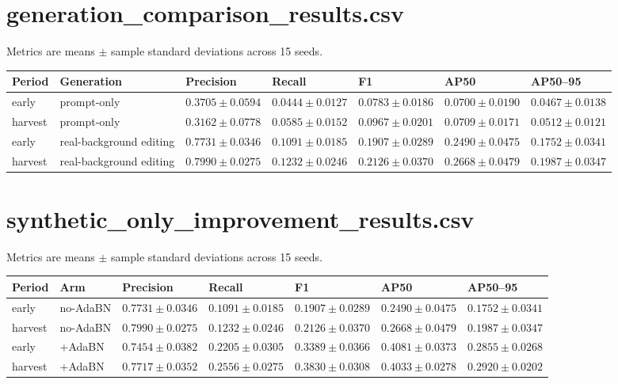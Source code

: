 \documentclass{article}
\begin{document}
\section*{generation\_comparison\_results.csv}
Metrics are means $\pm$ sample standard deviations across 15 seeds.\par\medskip
\begin{lrbox}{\resulttable}\begin{tabular}{lllllll}
\toprule
Period & Generation & Precision & Recall & F1 & AP50 & AP50--95 \\
\midrule
early & prompt-only & $0.3705 \pm 0.0594$ & $0.0444 \pm 0.0127$ & $0.0783 \pm 0.0186$ & $0.0700 \pm 0.0190$ & $0.0467 \pm 0.0138$ \\
harvest & prompt-only & $0.3162 \pm 0.0778$ & $0.0585 \pm 0.0152$ & $0.0967 \pm 0.0201$ & $0.0709 \pm 0.0171$ & $0.0512 \pm 0.0121$ \\
early & real-background editing & $0.7731 \pm 0.0346$ & $0.1091 \pm 0.0185$ & $0.1907 \pm 0.0289$ & $0.2490 \pm 0.0475$ & $0.1752 \pm 0.0341$ \\
harvest & real-background editing & $0.7990 \pm 0.0275$ & $0.1232 \pm 0.0246$ & $0.2126 \pm 0.0370$ & $0.2668 \pm 0.0479$ & $0.1987 \pm 0.0347$ \\
\bottomrule
\end{tabular}\end{lrbox}
\noindent\ifdim\wd\resulttable>\linewidth\resizebox{.99\linewidth}{!}{\usebox{\resulttable}}\else\usebox{\resulttable}\fi
\clearpage
\section*{synthetic\_only\_improvement\_results.csv}
Metrics are means $\pm$ sample standard deviations across 15 seeds.\par\medskip
\begin{lrbox}{\resulttable}\begin{tabular}{lllllll}
\toprule
Period & Arm & Precision & Recall & F1 & AP50 & AP50--95 \\
\midrule
early & no-AdaBN & $0.7731 \pm 0.0346$ & $0.1091 \pm 0.0185$ & $0.1907 \pm 0.0289$ & $0.2490 \pm 0.0475$ & $0.1752 \pm 0.0341$ \\
harvest & no-AdaBN & $0.7990 \pm 0.0275$ & $0.1232 \pm 0.0246$ & $0.2126 \pm 0.0370$ & $0.2668 \pm 0.0479$ & $0.1987 \pm 0.0347$ \\
early & +AdaBN & $0.7454 \pm 0.0382$ & $0.2205 \pm 0.0305$ & $0.3389 \pm 0.0366$ & $0.4081 \pm 0.0373$ & $0.2855 \pm 0.0268$ \\
harvest & +AdaBN & $0.7717 \pm 0.0352$ & $0.2556 \pm 0.0275$ & $0.3830 \pm 0.0308$ & $0.4033 \pm 0.0278$ & $0.2920 \pm 0.0202$ \\
\bottomrule
\end{tabular}\end{lrbox}
\noindent\ifdim\wd\resulttable>\linewidth\resizebox{.99\linewidth}{!}{\usebox{\resulttable}}\else\usebox{\resulttable}\fi
\clearpage
\end{document}
